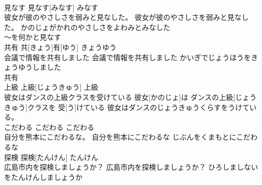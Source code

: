 \documentclass[8pt]{extreport}
\begin{document}
\begin{CJK}{UTF8}{min}
\\	見なす	見なす[みなす]	みなす	
\\	彼女が彼のやさしさを弱みと見なした。	彼女が彼のやさしさを弱みと見なした。	かのじょがかれのやさしさをよわみとみなした	
\\	～を何かと見なす			
\\	共有	共[きょう]有[ゆう]	きょうゆう	
\\	会議で情報を共有しました	会議で情報を共有しました	かいぎでじょうほうをきょうゆうしました	
\\	共有			
\\	上級	上級[じょうきゅう]	上級	
\\	彼女はダンスの上級クラスを受けている	彼女[かのじょ]は ダンスの上級[じょうきゅう]クラスを 受[う]けている	彼女はダンスのじょうきゅうくらすをうけている。	
\\	こだわる	こだわる	こだわる	
\\	自分を熊本にこだわるな。	自分を熊本にこだわるな	じぶんをくまもとにこだわるな	
\\	探検	探検[たんけん]	たんけん	
\\	広島市内を探検しましょうか？	広島市内を探検しましょうか？	ひろしましないをたんけんしましょうか	
\end{CJK}
\end{document}
